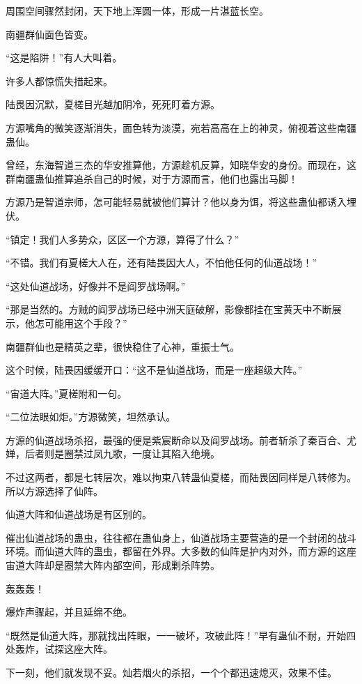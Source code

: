 
\begin{this_body}

周围空间骤然封闭，天下地上浑圆一体，形成一片湛蓝长空。

南疆群仙面色皆变。

“这是陷阱！”有人大叫着。

许多人都惊慌失措起来。

陆畏因沉默，夏槎目光越加阴冷，死死盯着方源。

方源嘴角的微笑逐渐消失，面色转为淡漠，宛若高高在上的神灵，俯视着这些南疆蛊仙。

曾经，东海智道三杰的华安推算他，方源趁机反算，知晓华安的身份。而现在，这群南疆蛊仙推算追杀自己的时候，对于方源而言，他们也露出马脚！

方源乃是智道宗师，怎可能轻易就被他们算计？他以身为饵，将这些蛊仙都诱入埋伏。

“镇定！我们人多势众，区区一个方源，算得了什么？”

“不错。我们有夏槎大人在，还有陆畏因大人，不怕他任何的仙道战场！”

“这处仙道战场，好像并不是阎罗战场啊。”

“那是当然的。方贼的阎罗战场已经中洲天庭破解，影像都挂在宝黄天中不断展示，他怎可能用这个手段？”

南疆群仙也是精英之辈，很快稳住了心神，重振士气。

这个时候，陆畏因缓缓开口：“这不是仙道战场，而是一座超级大阵。”

“宙道大阵。”夏槎附和一句。

“二位法眼如炬。”方源微笑，坦然承认。

方源的仙道战场杀招，最强的便是紫宸断命以及阎罗战场。前者斩杀了秦百合、尤婵，后者则是圈禁过凤九歌，一度让其陷入绝境。

不过这两者，都是七转层次，难以拘束八转蛊仙夏槎，而陆畏因同样是八转修为。所以方源选择了仙阵。

仙道大阵和仙道战场是有区别的。

催出仙道战场的蛊虫，往往都在蛊仙身上，仙道战场主要营造的是一个封闭的战斗环境。而仙道大阵的蛊虫，都留在外界。大多数的仙阵是护内对外，而方源的这座宙道大阵却是圈禁大阵内部空间，形成剿杀阵势。

轰轰轰！

爆炸声骤起，并且延绵不绝。

“既然是仙道大阵，那就找出阵眼，一一破坏，攻破此阵！”早有蛊仙不耐，开始四处轰炸，试探这座大阵。

下一刻，他们就发现不妥。灿若烟火的杀招，一个个都迅速熄灭，效果不佳。


\end{this_body}
